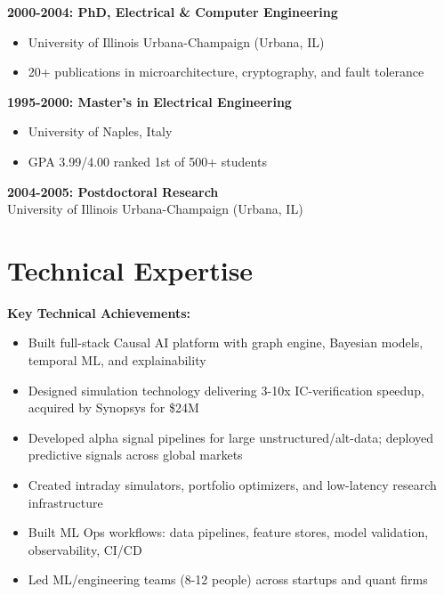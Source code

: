 \documentclass[10pt, letterpaper]{article}
\providecommand{\tightlist}{%
\setlength{\itemsep}{0pt}
\setlength{\parskip}{0pt}}
\begin{document}
  \textbf{2000-2004: PhD, Electrical \& Computer Engineering} \\
  \begin{itemize}
    \tightlist

    \item University of Illinois Urbana-Champaign (Urbana, IL)

    \item 20+ publications in microarchitecture, cryptography, and fault
      tolerance
  \end{itemize}

  \textbf{1995-2000: Master's in Electrical Engineering} \\
  \begin{itemize}
    \tightlist

    \item University of Naples, Italy

    \item GPA 3.99/4.00 ranked 1st of 500+ students
  \end{itemize}

  \textbf{2004-2005: Postdoctoral Research} \\ University of Illinois
  Urbana-Champaign (Urbana, IL)

  \section{\texorpdfstring{\textbf{Technical Expertise}}{Technical
  Expertise}}
  \label{technical-expertise}

  \textbf{Key Technical Achievements:}
  \begin{itemize}
    \tightlist

    \item Built full-stack Causal AI platform with graph engine,
      Bayesian models, temporal ML, and explainability

    \item Designed simulation technology delivering 3-10x IC-verification
      speedup, acquired by Synopsys for \$24M

    \item Developed alpha signal pipelines for large unstructured/alt-data;
      deployed predictive signals across global markets

    \item Created intraday simulators, portfolio optimizers, and low-latency
      research infrastructure

    \item Built ML Ops workflows: data pipelines, feature stores, model
      validation, observability, CI/CD

    \item Led ML/engineering teams (8-12 people) across startups and quant
      firms
  \end{itemize}
\end{document}
